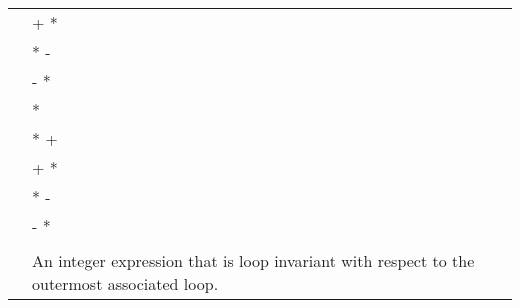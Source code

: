 \begin{ccppspecific}
\begin{supertabular}{ p{0.8in} p{4.5in}}
    & {} + {} {*} {} \\
    & {} {*} {} - {} \\
    & {} - {} {*} {} \\
    & {} {*} {} \\
    & {} {*} {} + {} \\
    & {} + {} {*} {} \\
    & {} {*} {} - {} \\
    & {} - {} {*} {} \\
    & \\
    {} & An integer expression that is loop invariant with respect
    to the outermost associated loop.\\
\end{supertabular}
\medskip

\end{ccppspecific}

